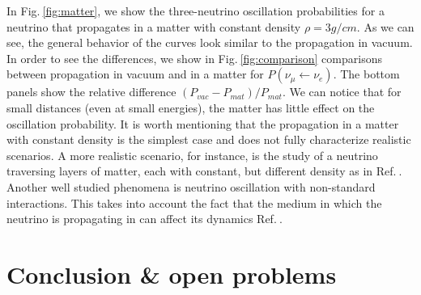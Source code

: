 \documentclass[twocolumn,secnumarabic,amssymb, nobibnotes, aps, prd,10pt]{revtex4-1}
\newcommand{\myref}[1]{Ref.$\:$\cite{#1}}
\newcommand{\Fig}[1]{Fig.$\:$\ref{#1}}
\begin{document}
In \Fig{fig:matter}, we show the three-neutrino oscillation probabilities for a neutrino
that propagates in a matter with constant density $\rho = 3 g/cm$. As we can see, the 
general behavior of the curves look similar to the propagation in vacuum. In order to
see the differences, we show in \Fig{fig:comparison} comparisons between propagation in
vacuum and in a matter for $P \left( \nu_\mu \longleftarrow \nu_e \right)$. The bottom
panels show the relative difference $\left( P_{vac} - P_{mat} \right) / P_{mat}$. We can
notice that for small distances (even at small energies), the matter has little effect
on the oscillation probability. It is worth mentioning that the propagation in a matter
with constant density is the simplest case and does not fully characterize realistic
scenarios. A more realistic scenario, for instance, is the study of a neutrino traversing
layers of matter, each with constant, but different density as in \myref{}. Another well
studied phenomena is neutrino oscillation with non-standard interactions. This takes into
account the fact that the medium in which the neutrino is propagating in can affect its
dynamics \myref{}.



\section{Conclusion \& open problems}
\label{sec:conclusion}





\end{document}
